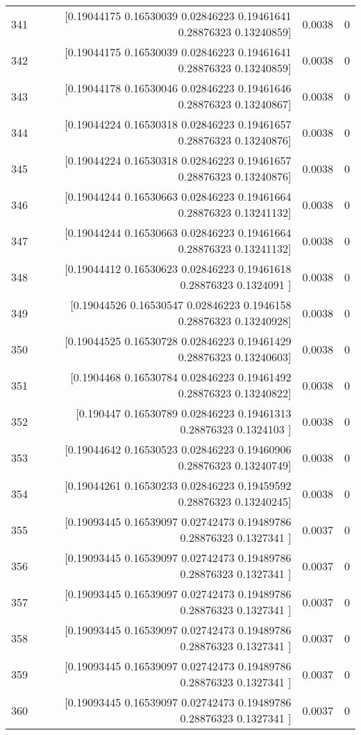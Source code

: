 \begin{longtable}{lrrr}
341 & [0.19044175 0.16530039 0.02846223 0.19461641 0.28876323 0.13240859] & 0.0038 & 0 \\
342 & [0.19044175 0.16530039 0.02846223 0.19461641 0.28876323 0.13240859] & 0.0038 & 0 \\
343 & [0.19044178 0.16530046 0.02846223 0.19461646 0.28876323 0.13240867] & 0.0038 & 0 \\
344 & [0.19044224 0.16530318 0.02846223 0.19461657 0.28876323 0.13240876] & 0.0038 & 0 \\
345 & [0.19044224 0.16530318 0.02846223 0.19461657 0.28876323 0.13240876] & 0.0038 & 0 \\
346 & [0.19044244 0.16530663 0.02846223 0.19461664 0.28876323 0.13241132] & 0.0038 & 0 \\
347 & [0.19044244 0.16530663 0.02846223 0.19461664 0.28876323 0.13241132] & 0.0038 & 0 \\
348 & [0.19044412 0.16530623 0.02846223 0.19461618 0.28876323 0.1324091 ] & 0.0038 & 0 \\
349 & [0.19044526 0.16530547 0.02846223 0.1946158  0.28876323 0.13240928] & 0.0038 & 0 \\
350 & [0.19044525 0.16530728 0.02846223 0.19461429 0.28876323 0.13240603] & 0.0038 & 0 \\
351 & [0.1904468  0.16530784 0.02846223 0.19461492 0.28876323 0.13240822] & 0.0038 & 0 \\
352 & [0.190447   0.16530789 0.02846223 0.19461313 0.28876323 0.1324103 ] & 0.0038 & 0 \\
353 & [0.19044642 0.16530523 0.02846223 0.19460906 0.28876323 0.13240749] & 0.0038 & 0 \\
354 & [0.19044261 0.16530233 0.02846223 0.19459592 0.28876323 0.13240245] & 0.0038 & 0 \\
355 & [0.19093445 0.16539097 0.02742473 0.19489786 0.28876323 0.1327341 ] & 0.0037 & 0 \\
356 & [0.19093445 0.16539097 0.02742473 0.19489786 0.28876323 0.1327341 ] & 0.0037 & 0 \\
357 & [0.19093445 0.16539097 0.02742473 0.19489786 0.28876323 0.1327341 ] & 0.0037 & 0 \\
358 & [0.19093445 0.16539097 0.02742473 0.19489786 0.28876323 0.1327341 ] & 0.0037 & 0 \\
359 & [0.19093445 0.16539097 0.02742473 0.19489786 0.28876323 0.1327341 ] & 0.0037 & 0 \\
360 & [0.19093445 0.16539097 0.02742473 0.19489786 0.28876323 0.1327341 ] & 0.0037 & 0 \\

\end{longtable}
